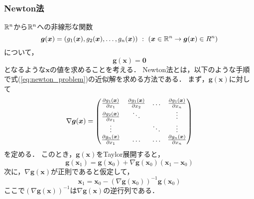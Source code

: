 \subsubsection{Newton法}
$\mathbb{R}^n$から$\mathbb{R}^n$への非線形な関数
\begin{equation}
    \bm{g}(\bm{x}) = \left(g_1(\bm{x}), g_2(\bm{x}), \dots, g_n(\bm{x})\right) \ : \ (\bm{x} \in \mathbb{R}^n \rightarrow \bm{g}(\bm{x}) \in R^n)
\end{equation}
について，
\begin{equation}
    \label{eq:newton_problem}
    \bm{g}(\bm{x}) = \bm{0}
\end{equation}
となるような$\bm{x}$の値を求めることを考える．
Newton法とは，以下のような手順で式(\ref{eq:newton_problem})の近似解を求める方法である．
まず，$\bm{g}(\bm{x})$に対して
\begin{equation}
    \nabla\bm{g}(\bm{x}) = \begin{pmatrix}
        \frac{\partial g_1(\bm{x})}{\partial x_1} & \frac{\partial g_1(\bm{x})}{\partial x_2} & \dots & \frac{\partial g_1(\bm{x})}{\partial x_n} \\
        \frac{\partial g_2(\bm{x})}{\partial x_1} & \ddots & & \vdots \\
        \vdots & & \ddots & \vdots\\
        \frac{\partial g_n(\bm{x})}{\partial x_1} & \dots & \dots & \frac{\partial g_n(\bm{x})}{\partial x_n}
    \end{pmatrix}
\end{equation}
を定める．
このとき，$\bm{g}(\bm{x})$をTaylor展開すると，
\begin{equation}
    \label{eq:tyalor_newton}
    \bm{g}(\bm{x}_1) = \bm{g}(\bm{x}_0) + \nabla\bm{g}(\bm{x}_0)(\bm{x}_1- \bm{x}_0)
\end{equation}
次に，$\nabla\bm{g}(\bm{x})$が正則であると仮定して，
\begin{equation}
    \bm{x}_1 = \bm{x}_0 - \left(\nabla\bm{g}(\bm{x}_0)\right)^{-1}\bm{g}(\bm{x}_0)
\end{equation}
ここで$\left(\nabla\bm{g}(\bm{x})\right)^{-1}$は$\nabla\bm{g}(\bm{x})$の逆行列である．
